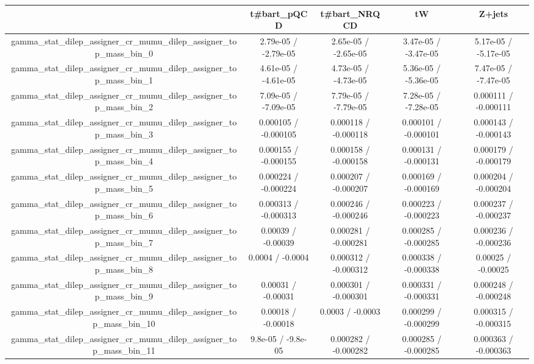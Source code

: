 \documentclass[10pt]{article}
\begin{document}
\begin{table}[htbp]
\begin{center}
\begin{tabular}{|c|c|c|c|c|}
\hline 
      & t#bar{t}_{pQCD}      & t#bar{t}_{NRQCD}      & tW      & Z+jets \\ 
\hline 
  gamma_stat_dilep_assigner_cr_mumu_dilep_assigner_top_mass_bin_0 & 2.79e-05 / -2.79e-05 & 2.65e-05 / -2.65e-05 & 3.47e-05 / -3.47e-05 & 5.17e-05 / -5.17e-05 \\ 
  gamma_stat_dilep_assigner_cr_mumu_dilep_assigner_top_mass_bin_1 & 4.61e-05 / -4.61e-05 & 4.73e-05 / -4.73e-05 & 5.36e-05 / -5.36e-05 & 7.47e-05 / -7.47e-05 \\ 
  gamma_stat_dilep_assigner_cr_mumu_dilep_assigner_top_mass_bin_2 & 7.09e-05 / -7.09e-05 & 7.79e-05 / -7.79e-05 & 7.28e-05 / -7.28e-05 & 0.000111 / -0.000111 \\ 
  gamma_stat_dilep_assigner_cr_mumu_dilep_assigner_top_mass_bin_3 & 0.000105 / -0.000105 & 0.000118 / -0.000118 & 0.000101 / -0.000101 & 0.000143 / -0.000143 \\ 
  gamma_stat_dilep_assigner_cr_mumu_dilep_assigner_top_mass_bin_4 & 0.000155 / -0.000155 & 0.000158 / -0.000158 & 0.000131 / -0.000131 & 0.000179 / -0.000179 \\ 
  gamma_stat_dilep_assigner_cr_mumu_dilep_assigner_top_mass_bin_5 & 0.000224 / -0.000224 & 0.000207 / -0.000207 & 0.000169 / -0.000169 & 0.000204 / -0.000204 \\ 
  gamma_stat_dilep_assigner_cr_mumu_dilep_assigner_top_mass_bin_6 & 0.000313 / -0.000313 & 0.000246 / -0.000246 & 0.000223 / -0.000223 & 0.000237 / -0.000237 \\ 
  gamma_stat_dilep_assigner_cr_mumu_dilep_assigner_top_mass_bin_7 & 0.00039 / -0.00039 & 0.000281 / -0.000281 & 0.000285 / -0.000285 & 0.000236 / -0.000236 \\ 
  gamma_stat_dilep_assigner_cr_mumu_dilep_assigner_top_mass_bin_8 & 0.0004 / -0.0004 & 0.000312 / -0.000312 & 0.000338 / -0.000338 & 0.00025 / -0.00025 \\ 
  gamma_stat_dilep_assigner_cr_mumu_dilep_assigner_top_mass_bin_9 & 0.00031 / -0.00031 & 0.000301 / -0.000301 & 0.000331 / -0.000331 & 0.000248 / -0.000248 \\ 
  gamma_stat_dilep_assigner_cr_mumu_dilep_assigner_top_mass_bin_10 & 0.00018 / -0.00018 & 0.0003 / -0.0003 & 0.000299 / -0.000299 & 0.000315 / -0.000315 \\ 
  gamma_stat_dilep_assigner_cr_mumu_dilep_assigner_top_mass_bin_11 & 9.8e-05 / -9.8e-05 & 0.000282 / -0.000282 & 0.000285 / -0.000285 & 0.000363 / -0.000363 \\ 

\end{tabular}
\end{center}
\end{table}
\end{document}
